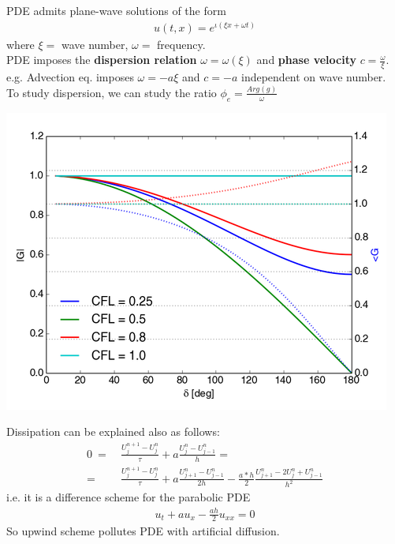 \documentclass{beamer}
\begin{document}
\begin{frame}
PDE admits plane-wave solutions of the form
\begin{align*}
u(t,x) = e^{\iota(\xi x + \omega t)}
\end{align*}
where $\xi = $ wave number, $\omega = $ frequency. \\
PDE imposes the \textbf{dispersion relation} $\omega = \omega(\xi)$ and \textbf{phase velocity} $c = \frac{\omega}{\xi}$. e.g. Advection eq. imposes $\omega = -a\xi$ and $c = -a$ independent on wave number. \\
To study dispersion, we can study the ratio $\phi_e = \frac{Arg(g)}{\omega}$
\end{frame}
\begin{frame}
\includegraphics[width=\textwidth]{up_g}
\end{frame}
\begin{frame}
Dissipation can be explained also as follows:
\begin{align*}
0 \ = \ & \frac{U_j^{n+1} - U_j^n}{\tau} + a \frac{U_j^n - U_{j-1}^n}{h} = \\
= \ & \frac{U_j^{n+1} - U_j^n}{\tau} + a \frac{U_{j+1}^n - U_{j-1}^n}{2h} - \frac{a * h}{2}\frac{U_{j+1}^n -2U_j^n + U_{j-1}^n}{h^2}
\end{align*}
i.e. it is a difference scheme for the parabolic PDE
\begin{align*}
u_t + a u_x - \frac{a h}{2}u_{xx} = 0
\end{align*}
So upwind scheme pollutes PDE with artificial diffusion.
\end{frame}
\end{document}
